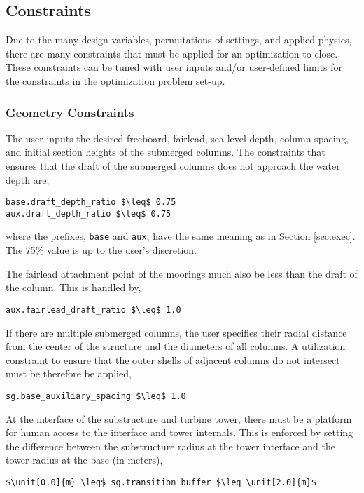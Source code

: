 \subsection{Constraints}
Due to the many design variables, permutations of settings, and applied
physics, there are many constraints that must be applied for an
optimization to close.  These constraints can be tuned with user inputs
and/or user-defined limits for the constraints in the optimization problem set-up.

\subsubsection{Geometry Constraints}
The user inputs the desired freeboard, fairlead, sea level depth, column
spacing, and initial section heights of the submerged columns.  The
constraints that ensures that the draft of the submerged columns does
not approach the water depth are,
\begin{lstlisting}
base.draft_depth_ratio $\leq$ 0.75
aux.draft_depth_ratio $\leq$ 0.75
\end{lstlisting}
where the prefixes, \texttt{base} and \texttt{aux}, have the same
meaning as in Section \ref{sec:exec}.  The 75\% value is up to the
user's discretion.

The fairlead attachment point of the moorings much also be less than the
draft of the column.  This is handled by,
\begin{lstlisting}
aux.fairlead_draft_ratio $\leq$ 1.0
\end{lstlisting}

If there are multiple submerged columns, the user specifies their radial
distance from the center of the structure and the diameters of all
columns.  A utilization constraint to ensure that the outer shells of adjacent
columns do not intersect must be therefore be applied,
\begin{lstlisting}
sg.base_auxiliary_spacing $\leq$ 1.0
\end{lstlisting}

At the interface of the substructure and turbine tower, there must be a
platform for human access to the interface and tower internals.  This is
enforced by setting the difference between the substructure radius at
the tower interface and the tower radius at the base (in meters),
\begin{lstlisting}
$\unit[0.0]{m} \leq$ sg.transition_buffer $\leq \unit[2.0]{m}$
\end{lstlisting}

